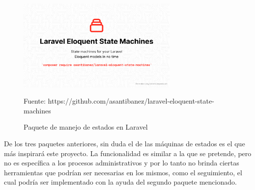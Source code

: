 \begin{figure}[!h]
    \centering
    \includegraphics[width=0.7\textwidth]{assets/laravelstatemachines}
    \caption{Paquete de manejo de estados en Laravel}{Fuente: https://github.com/asantibanez/laravel-eloquent-state-machines}
    \label{fig:laravelstatemachines}
\end{figure}

De los tres paquetes anteriores, sin duda el de las máquinas de estados es el que más inspirará este proyecto. La funcionalidad es similar a la que se pretende, pero no es específica a los procesos administrativos y por lo tanto no brinda ciertas herramientas que podrían ser necesarias en los mismos, como el seguimiento, el cual podría ser implementado con la ayuda del segundo paquete mencionado.
